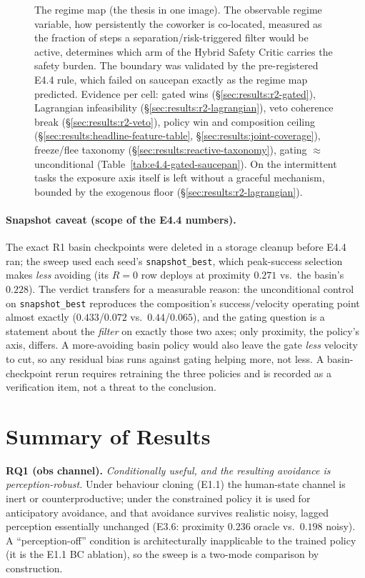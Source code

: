 \documentclass[11pt,a4paper]{report}
\begin{document}
\begin{figure}[htbp]
\caption{The regime map (the thesis in one image). The observable
regime variable, how persistently the coworker is co-located,
measured as the fraction of steps a separation/risk-triggered filter
would be active, determines which arm of the Hybrid Safety Critic
carries the safety burden. The boundary was validated by the
pre-registered E4.4 rule, which failed on saucepan exactly as the
regime map predicted.
Evidence per cell: gated wins
(\S\ref{sec:results:r2-gated}), Lagrangian infeasibility
(\S\ref{sec:results:r2-lagrangian}), veto coherence break
(\S\ref{sec:results:r2-veto}), policy win and composition ceiling
(\S\ref{sec:results:headline-feature-table},
\S\ref{sec:results:joint-coverage}), freeze/flee taxonomy
(\S\ref{sec:results:reactive-taxonomy}), gating $\approx$
unconditional (Table~\ref{tab:e4.4-gated-saucepan}). On the
intermittent tasks the exposure axis itself is left without a
graceful mechanism, bounded by the exogenous floor
(\S\ref{sec:results:r2-lagrangian}).}
\label{fig:regime-map}
\end{figure}

\paragraph{Snapshot caveat (scope of the E4.4 numbers).}
The exact R1 basin checkpoints were deleted in a storage cleanup
before E4.4 ran; the sweep used each seed's
\texttt{snapshot\_best}, which peak-success selection makes
\emph{less} avoiding (its $R = 0$ row deploys at proximity $0.271$
vs.\ the basin's $0.228$). The verdict transfers for a measurable
reason: the unconditional control on \texttt{snapshot\_best}
reproduces the composition's success/velocity operating point
almost exactly ($0.433$/$0.072$ vs.\ $0.44$/$0.065$), and the gating
question is a statement about the \emph{filter} on exactly those two
axes; only proximity, the policy's axis, differs. A more-avoiding
basin policy would also leave the gate \emph{less} velocity to cut,
so any residual bias runs against gating helping more, not less. A
basin-checkpoint rerun requires retraining the three policies and is
recorded as a verification item, not a threat to the conclusion.

\section{Summary of Results}
\label{sec:results:summary}

\textbf{RQ1 (obs channel).} \emph{Conditionally useful, and the
resulting avoidance is perception-robust.} Under behaviour cloning
(E1.1) the human-state channel is inert or counterproductive; under
the constrained policy it is used for anticipatory avoidance, and that
avoidance survives realistic noisy, lagged perception essentially
unchanged (E3.6: proximity $0.236$ oracle vs.\ $0.198$ noisy). A
``perception-off'' condition is architecturally inapplicable to the
trained policy (it is the E1.1 BC ablation), so the sweep is a
two-mode comparison by construction.
\end{document}
